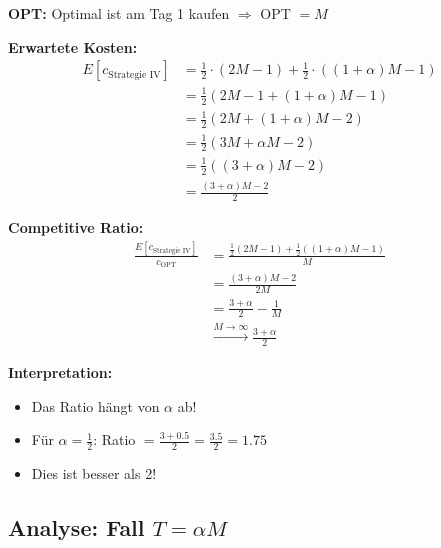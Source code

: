 \documentclass[12pt,a4paper]{article}
\theoremstyle{definition}
\begin{document}
\begin{tcolorbox}[colback=purple!5!white,colframe=purple!75!black,title=Fall $T = M$]

\textbf{OPT:} Optimal ist am Tag 1 kaufen $\Rightarrow$ OPT $= M$

\textbf{Erwartete Kosten:}
\begin{align*}
E[c_{\text{Strategie IV}}] &= \frac{1}{2} \cdot (2M-1) + \frac{1}{2} \cdot ((1+\alpha)M-1) \\
&= \frac{1}{2}(2M - 1 + (1+\alpha)M - 1) \\
&= \frac{1}{2}(2M + (1+\alpha)M - 2) \\
&= \frac{1}{2}(3M + \alpha M - 2) \\
&= \frac{1}{2}((3+\alpha)M - 2) \\
&= \frac{(3+\alpha)M - 2}{2}
\end{align*}

\textbf{Competitive Ratio:}
\begin{align*}
\frac{E[c_{\text{Strategie IV}}]}{c_{\text{OPT}}} &= \frac{\frac{1}{2}(2M-1) + \frac{1}{2}((1+\alpha)M-1)}{M} \\
&= \frac{(3+\alpha)M - 2}{2M} \\
&= \frac{3+\alpha}{2} - \frac{1}{M} \\
&\xrightarrow{M \to \infty} \frac{3+\alpha}{2}
\end{align*}

\textbf{Interpretation:}
\begin{itemize}
    \item Das Ratio hängt von $\alpha$ ab!
    \item Für $\alpha = \frac{1}{2}$: Ratio $= \frac{3+0.5}{2} = \frac{3.5}{2} = 1.75$
    \item Dies ist besser als 2!
\end{itemize}
\end{tcolorbox}

\subsection{Analyse: Fall $T = \alpha M$}
\end{document}

